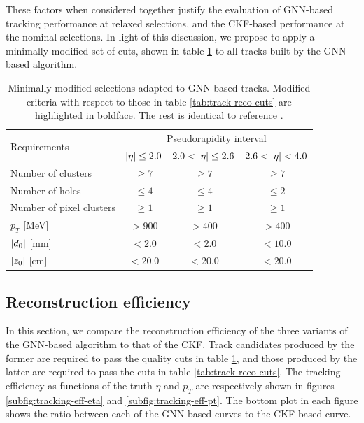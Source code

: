 These factors when considered together justify the evaluation of GNN-based tracking performance at relaxed selections, and the CKF-based performance at the nominal selections. 
In light of this discussion, we propose to apply a minimally modified set of cuts, shown in table \ref{tab:track-reco-cuts-semi-relaxed} to all tracks built by the GNN-based algorithm.

\begin{table}[h!]
    \centering
    \begin{tabular}{|l|c|c|c|} \hline
       \multirow{2}{*}{Requirements}  & \multicolumn{3}{c|}{Pseudorapidity interval} \\ \cline{2-4}
         & $\abs{\eta} \le 2.0 $ & $2.0< \abs{\eta} \le 2.6$ & $2.6 < \abs{\eta} < 4.0 $ \\ \hline
         {Number of clusters} & $\ge 7$ & $\ge 7$ & $\ge 7$ \\
         {Number of holes} & $\le 4$ & $\le 4$ & $\le 2 $ \\
         Number of pixel clusters & $\ge 1$ & $\ge 1$ & $\ge 1$ \\
         $p_T$ [MeV] & $> 900$ & $>400$ & $>400$ \\
         $\abs{d_0}$ [mm] & $< 2.0$ & $<2.0$ & $<10.0$ \\
         $\abs{z_0}$ [cm] & $< 20.0$ & $<20.0$ & $<20.0$ \\
         \hline     
    \end{tabular}
    \caption{Minimally modified selections adapted to GNN-based tracks. Modified criteria with respect to those in table \ref{tab:track-reco-cuts} are highlighted in boldface. The rest is identical to reference \cite{Aad_2025}.}
    \label{tab:track-reco-cuts-semi-relaxed}
\end{table}

\subsection{Reconstruction efficiency}
\label{subsect:tracking-efficiency}

In this section, we compare the reconstruction efficiency of the three variants of the GNN-based algorithm to that of the CKF.
Track candidates produced by the former are required to pass the quality cuts in table \ref{tab:track-reco-cuts-semi-relaxed}, and those produced by the latter are required to pass the cuts in table \ref{tab:track-reco-cuts}. 
The tracking efficiency as functions of the truth $\eta$ and $p_T$ are respectively shown in figures \ref{subfig:tracking-eff-eta} and \ref{subfig:tracking-eff-pt}. 
The bottom plot in each figure shows the ratio between each of the GNN-based curves to the CKF-based curve.

